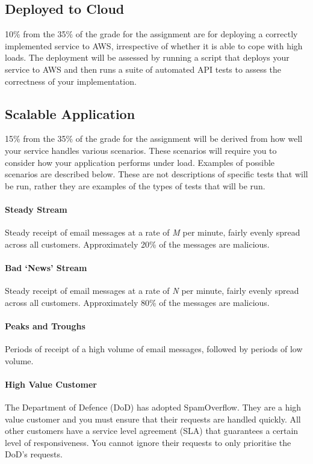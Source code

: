 \documentclass{csse4400}
\begin{document}
\subsection{Deployed to Cloud} %
10\% from the 35\% of the grade for the assignment are for deploying a correctly implemented service to AWS,
irrespective of whether it is able to cope with high loads.
The deployment will be assessed by running a script that deploys your service to AWS
and then runs a suite of automated API tests to assess the correctness of your implementation.

\subsection{Scalable Application}\label{sec:scenarios} %
15\% from the 35\% of the grade for the assignment will be derived from how well your service handles various scenarios.
These scenarios will require you to consider how your application performs under load.
Examples of possible scenarios are described below.
These are not descriptions of specific tests that will be run,
rather they are examples of the types of tests that will be run.

\paragraph{Steady Stream}
Steady receipt of email messages at a rate of \emph{M} per minute, fairly evenly spread across all customers.
Approximately 20\% of the messages are malicious.

\paragraph{Bad `News' Stream}
Steady receipt of email messages at a rate of \emph{N} per minute, fairly evenly spread across all customers.
Approximately 80\% of the messages are malicious.

\paragraph{Peaks and Troughs}
Periods of receipt of a high volume of email messages, followed by periods of low volume.

\paragraph{High Value Customer}
The Department of Defence (DoD) has adopted SpamOverflow.
They are a high value customer and you must ensure that their requests are handled quickly.
All other customers have a service level agreement (SLA) that guarantees a certain level of responsiveness.
You cannot ignore their requests to only prioritise the DoD's requests.
\end{document}
